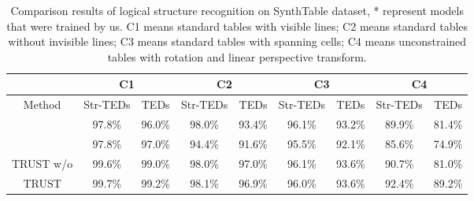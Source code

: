 \documentclass[lettersize,journal]{IEEEtran}
\begin{document}
\setlength{\tabcolsep}{4pt}
\begin{table*}
\begin{center}
\caption{Comparison results of logical structure recognition on SynthTable dataset, * represent models that were trained by us. C1 means standard tables with visible lines; C2 means standard tables without invisible lines; C3 means standard tables with spanning cells; C4 means unconstrained tables with rotation and linear perspective transform. }
\label{table:SynthTable}
\begin{tabular}{c|cc|cc|cc|cc}
\hline\noalign{\smallskip}\
& \multicolumn{2}{c|}{\textbf{C1}} & \multicolumn{2}{c|}{\textbf{C2}} & \multicolumn{2}{c|}{\textbf{C3}} & \multicolumn{2}{c}{\textbf{C4}}\\
\hline
Method  & Str-TEDs & TEDs & Str-TEDs & TEDs & Str-TEDs & TEDs & Str-TEDs & TEDs \\
\noalign{\smallskip}
\hline
\noalign{\smallskip}
\cite{long2021parsing} & 97.8\% &  96.0\% & 98.0\% & 93.4\%   & 96.1\%  & 93.2\%  & 89.9\%  & 81.4\% \\
\cite{zhong2020image}  & 97.8\%  &  97.0\%   &  94.4\%   & 91.6\%  &  95.5\%  & 92.1\% &  85.6\%   & 74.9\%\\
TRUST w/o\cite{tensmeyer2019deep} & 99.6\% &  99.0\%  & 98.0\%    & 97.0\%  & 96.1\%    & 93.6\%  & 90.7\%    & 81.0\% \\
\hline
TRUST  & 99.7\% & 99.2\% &  98.1\% &  96.9\% &  96.0\% &  93.6\% &  92.4\% &  89.2\% \\
\hline
\end{tabular}
\end{center}
\end{table*}
\setlength{\tabcolsep}{1.4pt}





\end{document}
